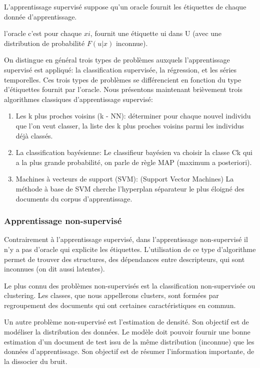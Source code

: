 \documentclass[12pt]{article}
\begin{document}
L'apprentissage supervisé suppose qu'un oracle fournit les étiquettes de chaque donnée d'apprentissage.

l’oracle c’est pour chaque $xi$, fournit une étiquette ui dans U (avec une distribution de probabilité $F(u|x)$ inconnue).

On distingue en général trois types de problèmes auxquels l'apprentissage supervisé est appliqué: la classification supervisée, la régression, et les séries temporelles. Ces trois types de problèmes se différencient en fonction du type d'étiquettes fournit par l'oracle.
Nous présentons maintenant brièvement trois algorithmes classiques d'apprentissage supervisé:
\begin{enumerate}
	\item Les k plus proches voisins (k - NN): déterminer pour chaque nouvel individu que l'on veut classer, la liste des k plus proches voisins parmi les individus déjà classés.
	\item La classification bayésienne: Le classifieur bayésien va choisir la classe Ck qui a la plus grande probabilité, on parle de règle MAP (maximum a posteriori).
	\item Machines à vecteurs de support (SVM): (Support Vector Machines) La méthode à base de SVM cherche l'hyperplan séparateur le plus éloigné des documents du corpus d'apprentissage.
\end{enumerate}

\subsubsection{Apprentissage non-supervisé}
Contrairement à l'apprentissage supervisé, dans l'apprentissage non-supervisé il n'y a pas d'oracle qui explicite les étiquettes. L'utilisation de ce type d'algorithme permet de trouver des structures, des dépendances entre descripteurs, qui sont inconnues (on dit aussi latentes). 

Le plus connu des problèmes non-supervisés est la classification non-supervisée ou clustering. Les classes, que nous appellerons clusters, sont formées par regroupement des documents qui ont certaines caractéristiques en commun.

Un autre problème non-supervisé est l'estimation de densité. Son objectif est de modéliser la distribution des données. Le modèle doit pouvoir fournir une bonne estimation d'un document de test issu de la même distribution (inconnue) que les données d'apprentissage. Son objectif est de résumer l'information importante, de la dissocier du bruit.
\end{document}

